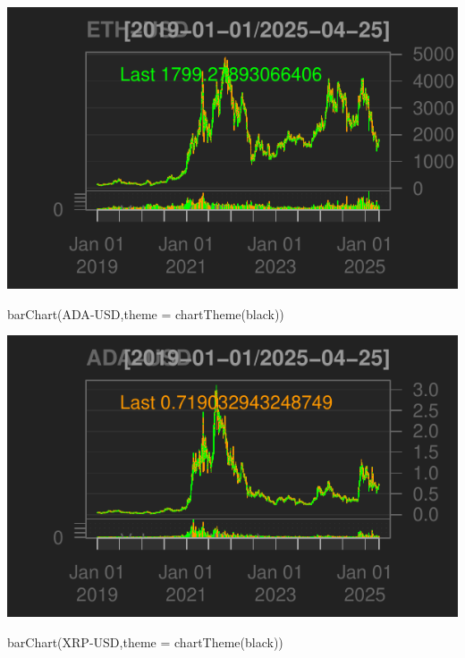 \documentclass[]{tufte-handout}
\newenvironment{Shaded}{}{}
\newcommand{\AttributeTok}[1]{\textcolor[rgb]{0.49,0.56,0.16}{#1}}
\newcommand{\FunctionTok}[1]{\textcolor[rgb]{0.02,0.16,0.49}{#1}}
\newcommand{\NormalTok}[1]{#1}
\newcommand{\StringTok}[1]{\textcolor[rgb]{0.25,0.44,0.63}{#1}}
\begin{document}
\includegraphics{cripto_update_files/figure-latex/unnamed-chunk-3-3}

\begin{Shaded}
\begin{Highlighting}[]
\FunctionTok{barChart}\NormalTok{(}\StringTok{\textasciigrave{}}\AttributeTok{ADA{-}USD}\StringTok{\textasciigrave{}}\NormalTok{,}\AttributeTok{theme =} \FunctionTok{chartTheme}\NormalTok{(}\StringTok{\textquotesingle{}black\textquotesingle{}}\NormalTok{))}
\end{Highlighting}
\end{Shaded}

\includegraphics{cripto_update_files/figure-latex/unnamed-chunk-3-4}

\begin{Shaded}
\begin{Highlighting}[]
\FunctionTok{barChart}\NormalTok{(}\StringTok{\textasciigrave{}}\AttributeTok{XRP{-}USD}\StringTok{\textasciigrave{}}\NormalTok{,}\AttributeTok{theme =} \FunctionTok{chartTheme}\NormalTok{(}\StringTok{\textquotesingle{}black\textquotesingle{}}\NormalTok{))}
\end{Highlighting}
\end{Shaded}
\end{document}
